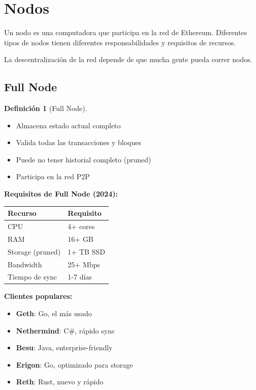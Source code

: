 \documentclass[11pt,a4paper,twoside,openright]{book}
\theoremstyle{definition}
\newtheorem{definition}{Definición}[chapter]
\theoremstyle{plain}
\theoremstyle{remark}
\begin{document}
\section{Nodos}

\begin{intuicion}
Un nodo es una computadora que participa en la red de Ethereum. Diferentes tipos de nodos tienen diferentes responsabilidades y requisitos de recursos.

La descentralización de la red depende de que mucha gente pueda correr nodos.
\end{intuicion}

\subsection{Full Node}

\begin{definition}[Full Node]
\begin{itemize}
    \item Almacena estado actual completo
    \item Valida todas las transacciones y bloques
    \item Puede no tener historial completo (pruned)
    \item Participa en la red P2P
\end{itemize}
\end{definition}

\begin{mathnote}
\textbf{Requisitos de Full Node (2024):}

\begin{center}
\begin{tabular}{ll}
\toprule
\textbf{Recurso} & \textbf{Requisito} \\
\midrule
CPU & 4+ cores \\
RAM & 16+ GB \\
Storage (pruned) & 1+ TB SSD \\
Bandwidth & 25+ Mbps \\
Tiempo de sync & 1-7 días \\
\bottomrule
\end{tabular}
\end{center}

\textbf{Clientes populares:}
\begin{itemize}
    \item \textbf{Geth}: Go, el más usado
    \item \textbf{Nethermind}: C\#, rápido sync
    \item \textbf{Besu}: Java, enterprise-friendly
    \item \textbf{Erigon}: Go, optimizado para storage
    \item \textbf{Reth}: Rust, nuevo y rápido
\end{itemize}
\end{mathnote}
\end{document}
